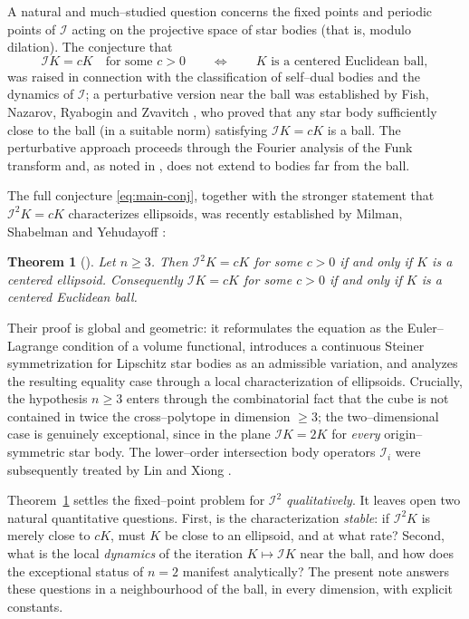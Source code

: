 \documentclass[10pt,a4paper]{amsart}
\newtheorem{theorem}{Theorem}[section]
\newcommand{\IB}{\mathcal{I}}
\begin{document}
A natural and much--studied question concerns the fixed points and periodic
points of $\IB$ acting on the projective space of star bodies (that is, modulo
dilation). The conjecture that
\begin{equation}\label{eq:main-conj}
   \IB K = cK \quad\text{for some } c>0 \qquad\Longleftrightarrow\qquad
   K \text{ is a centered Euclidean ball},
\end{equation}
was raised in connection with the classification of self--dual bodies and the
dynamics of $\IB$; a perturbative version near the ball was established by
Fish, Nazarov, Ryabogin and Zvavitch \cite{FNRZ2011}, who proved that any
star body sufficiently close to the ball (in a suitable norm) satisfying
$\IB K = cK$ is a ball. The perturbative approach proceeds through the Fourier
analysis of the Funk transform and, as noted in \cite{FNRZ2011}, does not
extend to bodies far from the ball.

The full conjecture \eqref{eq:main-conj}, together with the stronger
statement that $\IB^2 K = cK$ characterizes ellipsoids, was recently
established by Milman, Shabelman and Yehudayoff \cite{MSY2025}:

\begin{theorem}[\cite{MSY2025}]\label{thm:MSY}
Let $n\ge 3$. Then $\IB^2 K = cK$ for some $c>0$ if and only if $K$ is a
centered ellipsoid. Consequently $\IB K = cK$ for some $c>0$ if and only if
$K$ is a centered Euclidean ball.
\end{theorem}

Their proof is global and geometric: it reformulates the equation as the
Euler--Lagrange condition of a volume functional, introduces a continuous
Steiner symmetrization for Lipschitz star bodies as an admissible variation,
and analyzes the resulting equality case through a local characterization of
ellipsoids. Crucially, the hypothesis $n\ge 3$ enters through the combinatorial
fact that the cube is not contained in twice the cross--polytope in dimension
$\ge 3$; the two--dimensional case is genuinely exceptional, since in the plane
$\IB K = 2K$ for \emph{every} origin--symmetric star body. The lower--order
intersection body operators $\IB_i$ were subsequently treated by Lin and Xiong
\cite{LinXiong2025}.

Theorem~\ref{thm:MSY} settles the fixed--point problem for $\IB^2$
\emph{qualitatively}. It leaves open two natural quantitative questions.
First, is the characterization \emph{stable}: if $\IB^2 K$ is merely close to
$cK$, must $K$ be close to an ellipsoid, and at what rate? Second, what is the
local \emph{dynamics} of the iteration $K\mapsto \IB K$ near the ball, and how
does the exceptional status of $n=2$ manifest analytically? The present note
answers these questions in a neighbourhood of the ball, in every dimension,
with explicit constants.
\end{document}
